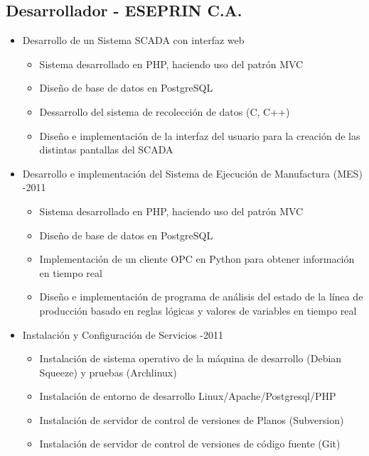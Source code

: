 \documentclass[letterpaper,11pt]{report}
\begin{document}
\subsection*{Desarrollador - ESEPRIN C.A.}
  \begin{itemize}
    \item Desarrollo de un Sistema SCADA con interfaz web
        \begin{itemize}
        \item Sistema desarrollado en PHP, haciendo uso del patrón MVC
        \item Diseño de base de datos en PostgreSQL
        \item Dessarrollo del sistema de recolección de datos (C, C++)
        \item Diseño e implementación de la interfaz del usuario para la creación de las distintas pantallas del SCADA
        \end{itemize}
    \item Desarrollo e implementación del Sistema de Ejecución de Manufactura (MES) -2011
        \begin{itemize}
        \item Sistema desarrollado en PHP, haciendo uso del patrón MVC
        \item Diseño de base de datos en PostgreSQL
        \item Implementación de un cliente OPC en Python para obtener información en tiempo real
        \item Diseño e implementación de programa de análisis del estado de la línea de producción basado en reglas lógicas y valores de variables en tiempo real
        \end{itemize}
    \item Instalación y Configuración de Servicios -2011
        \begin{itemize}
        \item Instalación de sistema operativo de la máquina de desarrollo (Debian Squeeze) y pruebas (Archlinux)
        \item Instalación de entorno de desarrollo Linux/Apache/Postgresql/PHP
        \item Instalación de servidor de control de versiones de Planos (Subversion)
        \item Instalación de servidor de control de versiones de código fuente (Git)
        \end{itemize}
  \end{itemize}
\end{document}

